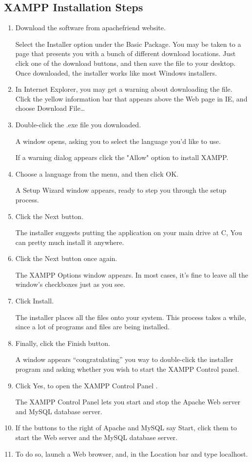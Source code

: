 \subsection {XAMPP Installation Steps}
\begin{enumerate}
\item Download the software from apachefriend website.

Select the Installer option under the Basic Package. You may be taken to a page that presents you with a bunch of different download locations. Just click one of the download buttons, and then save the file to your desktop. Once downloaded, the installer works like most Windows installers.

\item In Internet Explorer, you may get a warning about downloading the file. Click the yellow information bar that appears above the Web page in IE, and choose Download File…

\item Double-click the .exe file you downloaded.

A window opens, asking you to select the language you’d like to use.

If a warning dialog appears click the "Allow" option to install XAMPP.
\item Choose a language from the menu, and then click OK.

A Setup Wizard window appears, ready to step you through the setup process.
\item Click the Next button.

The installer suggests putting the application on your main drive at C, You can pretty much install it anywhere.
\item Click the Next button once again.

The XAMPP Options window appears. In most cases, it’s fine to leave all the window’s checkboxes just as you see.
\item Click Install.

The installer places all the files onto your system. This process takes a while, since a lot of programs and files are being installed.
\item Finally, click the Finish button.

A window appears ``congratulating'' you way to double-click the installer program and asking whether you wish to start the XAMPP Control panel.
\item Click Yes, to open the XAMPP Control Panel .

The XAMPP Control Panel lets you start and stop the Apache Web server and MySQL database server.
\item If the buttons to the right of Apache and MySQL say Start, click them to start the Web server and the MySQL database server.
\item To do so, launch a Web browser, and, in the Location bar and type localhost.

\end{enumerate}


